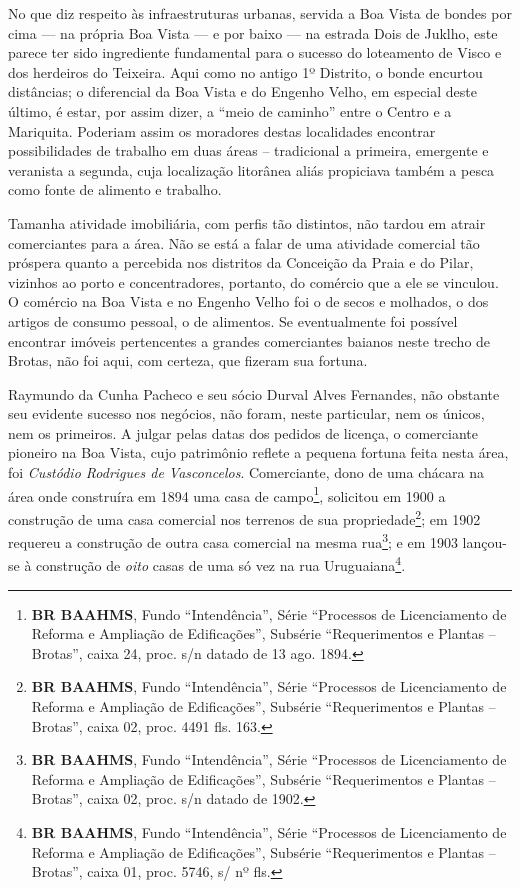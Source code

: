 



No que diz respeito às infraestruturas urbanas, servida a Boa Vista de bondes por cima --- na própria Boa Vista --- e por baixo --- na estrada Dois de Juklho, este parece ter sido ingrediente fundamental para o sucesso do loteamento de Visco e dos herdeiros do Teixeira. Aqui como no antigo 1º Distrito, o bonde encurtou distâncias; o diferencial da Boa Vista e do Engenho Velho, em especial deste último, é estar, por assim dizer, a ``meio de caminho'' entre o Centro e a Mariquita. Poderiam assim os moradores destas localidades encontrar possibilidades de trabalho em duas áreas -- tradicional a primeira, emergente e veranista a segunda, cuja localização litorânea aliás propiciava também a pesca como fonte de alimento e trabalho.


Tamanha atividade imobiliária, com perfis tão distintos, não tardou em atrair comerciantes para a área. Não se está a falar de uma atividade comercial tão próspera quanto a percebida nos distritos da Conceição da Praia e do Pilar, vizinhos ao porto e concentradores, portanto, do comércio que a ele se vinculou. O comércio na Boa Vista e no Engenho Velho foi o de secos e molhados, o dos artigos de consumo pessoal, o de alimentos. Se eventualmente foi possível encontrar imóveis pertencentes a grandes comerciantes baianos neste trecho de Brotas, não foi aqui, com certeza, que fizeram sua fortuna.

Raymundo da Cunha Pacheco e seu sócio Durval Alves Fernandes, não obstante seu evidente sucesso nos negócios, não foram, neste particular, nem os únicos, nem os primeiros. A julgar pelas datas dos pedidos de licença, o comerciante pioneiro na Boa Vista, cujo patrimônio reflete a pequena fortuna feita nesta área, foi \textit{Custódio Rodrigues de Vasconcelos}. Comerciante, dono de uma chácara na área onde construíra em 1894 uma casa de campo\footnote{\textbf{BR BAAHMS}, Fundo ``Intendência'', Série ``Processos de Licenciamento de Reforma e Ampliação de Edificações'', Subsérie ``Requerimentos e Plantas -- Brotas'', caixa 24, proc. s/n datado de 13 ago. 1894.}, solicitou em 1900 a construção de uma casa comercial nos terrenos de sua propriedade\footnote{\textbf{BR BAAHMS}, Fundo ``Intendência'', Série ``Processos de Licenciamento de Reforma e Ampliação de Edificações'', Subsérie ``Requerimentos e Plantas -- Brotas'', caixa 02, proc. 4491 fls. 163.}; em 1902 requereu a construção de outra casa comercial na mesma rua\footnote{\textbf{BR BAAHMS}, Fundo ``Intendência'', Série ``Processos de Licenciamento de Reforma e Ampliação de Edificações'', Subsérie ``Requerimentos e Plantas -- Brotas'', caixa 02, proc. s/n datado de 1902.}; e em 1903 lançou-se à construção de \textit{oito} casas de uma só vez na rua Uruguaiana\footnote{\textbf{BR BAAHMS}, Fundo ``Intendência'', Série ``Processos de Licenciamento de Reforma e Ampliação de Edificações'', Subsérie ``Requerimentos e Plantas -- Brotas'', caixa 01, proc. 5746, s/ nº fls.}.

